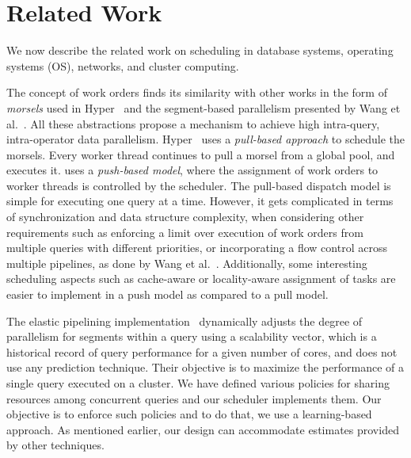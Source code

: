 \section{Related Work}\label{sec:related}
We now describe the related work on scheduling in database systems, operating systems (OS), networks, and cluster computing. 

The concept of work orders finds its similarity with other works in the form of \textit{morsels} used in Hyper~\cite{morsel} and the segment-based parallelism presented by Wang et al.~\cite{wang2016elastic}. 
All these abstractions propose a mechanism to achieve high intra-query, intra-operator data parallelism.
Hyper~\cite{morsel} uses a \textit{pull-based approach} to schedule the morsels. 
Every worker thread continues to pull a morsel from a global pool, and executes it.
\sys{} uses a \textit{push-based model}, where the assignment of work orders to worker threads is controlled by the scheduler.
The pull-based dispatch model is simple for executing one query at a time. 
However, it gets complicated in terms of synchronization and data structure complexity, when considering other requirements such as enforcing a limit over execution of work orders from multiple queries with different priorities, or incorporating a flow control across multiple pipelines, as done by Wang et al.~\cite{wang2016elastic}.
Additionally, some interesting scheduling aspects such as cache-aware or locality-aware assignment of tasks are easier to implement in a push model as compared to a pull model.

The elastic pipelining implementation~\cite{wang2016elastic} dynamically adjusts the degree of parallelism for segments within a query using a scalability vector, which is a historical record of query performance for a given number of cores, and does not use any prediction technique.
Their objective is to maximize the performance of a single query executed on a cluster.
We have defined various policies for sharing resources among concurrent queries and our scheduler implements them. 
Our objective is to enforce such policies and to do that, we use a learning-based approach.
As mentioned earlier, our design can accommodate estimates provided by other techniques.

